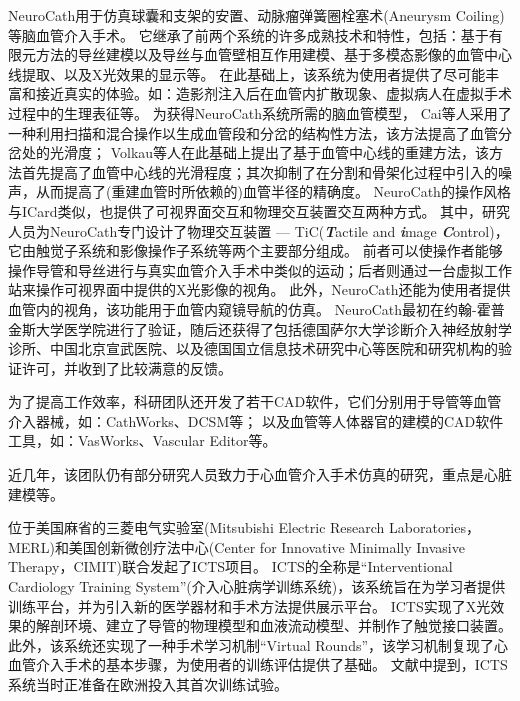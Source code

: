 NeuroCath用于仿真球囊和支架的安置、动脉瘤弹簧圈栓塞术(Aneurysm Coiling)等脑血管介入手术。
它继承了前两个系统的许多成熟技术和特性，包括：基于有限元方法的导丝建模以及导丝与血管壁相互作用建模\cite{Wang1996daVinci}\cite{Chui1996daVinci}、基于多模态影像的血管中心线提取\cite{Wang1998ICard}、以及X光效果的显示\cite{Wang1998aICard}\cite{Wang1998ICard}等。
在此基础上，该系统为使用者提供了尽可能丰富和接近真实的体验。如：造影剂注入后在血管内扩散现象、虚拟病人在虚拟手术过程中的生理表征等。
为获得NeuroCath系统所需的脑血管模型，
Cai等人\cite{Ye2002Vessel}\cite{Cai2003aVessel}\cite{Cai2003Vessel}采用了一种利用扫描和混合操作以生成血管段和分岔的结构性方法，该方法提高了血管分岔处的光滑度；
Volkau等人\cite{Volkau2005Vessel}\cite{Volkau2008Vessel}在此基础上提出了基于血管中心线的重建方法，该方法首先提高了血管中心线的光滑程度；其次抑制了在分割和骨架化过程中引入的噪声，从而提高了(重建血管时所依赖的)血管半径的精确度。
NeuroCath的操作风格与ICard类似，也提供了可视界面交互和物理交互装置交互两种方式\cite{Nowinski2001NeuroCath}。
其中，研究人员为NeuroCath专门设计了物理交互装置 --- TiC(\textbf{\textit{T}}actile and \textbf{\textit{i}}mage \textbf{\textit{C}}ontrol)\cite{Chui1999TiC}\cite{Ma1999TiC}，它由触觉子系统和影像操作子系统等两个主要部分组成。
前者可以使操作者能够操作导管和导丝进行与真实血管介入手术中类似的运动；后者则通过一台虚拟工作站来操作可视界面中提供的X光影像的视角。
此外，NeuroCath还能为使用者提供血管内的视角，该功能用于血管内窥镜导航的仿真\cite{Nowinski2001NeuroCath}。
NeuroCath最初在约翰-霍普金斯大学医学院进行了验证，随后还获得了包括德国萨尔大学诊断介入神经放射学诊所、中国北京宣武医院、以及德国国立信息技术研究中心等医院和研究机构的验证许可，并收到了比较满意的反馈\cite{Ma2007NeuroCath}。

为了提高工作效率，科研团队还开发了若干CAD软件，它们分别用于导管等血管介入器械，如：CathWorks\cite{Cai1998CathWorks}\cite{Cai2000CathWorks}、DCSM\cite{Li2001DCSM}等； 以及血管等人体器官的建模的CAD软件工具，如：VasWorks\cite{Cai2003Vessel}、Vascular Editor\cite{Ma2007NeuroCath}等。

近几年，该团队仍有部分研究人员致力于心血管介入手术仿真的研究，重点是心脏建模\cite{Chiang2011}\cite{Chiang2012}等。

位于美国麻省的三菱电气实验室(Mitsubishi Electric Research Laboratories，MERL)\cite{merlweb}和美国创新微创疗法中心(Center for Innovative Minimally Invasive Therapy，CIMIT)\cite{cimitweb}联合发起了ICTS项目\cite{Dawson2000ICTS}\cite{Cotin2000ICTS}\cite{Shaffer1999ICTS}。
ICTS的全称是“Interventional Cardiology Training System”(介入心脏病学训练系统)，该系统旨在为学习者提供训练平台，并为引入新的医学器材和手术方法提供展示平台\cite{Cotin2000ICTS}。
ICTS实现了X光效果的解剖环境、建立了导管的物理模型和血液流动模型、并制作了触觉接口装置\cite{Cotin2000ICTS}。
此外，该系统还实现了一种手术学习机制“Virtual Rounds”\cite{Shaffer1999ICTS}，该学习机制复现了心血管介入手术的基本步骤，为使用者的训练评估提供了基础。
文献\cite{Dawson2000ICTS}中提到，ICTS系统当时正准备在欧洲投入其首次训练试验。


